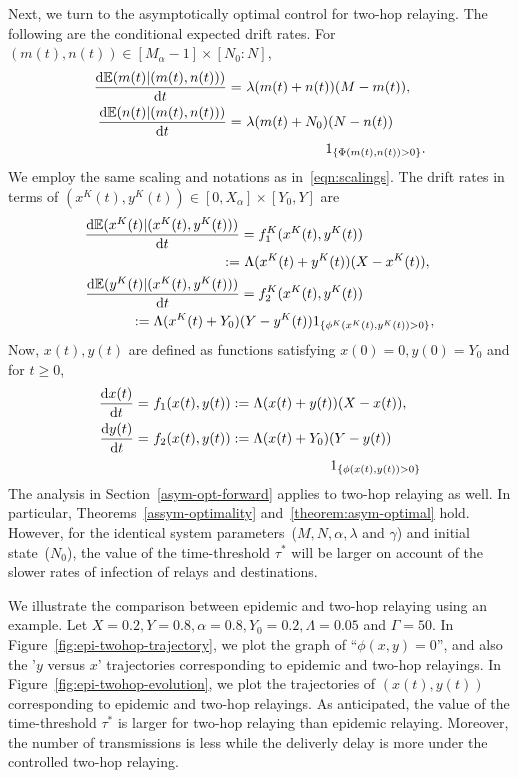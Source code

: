 \documentclass[10pt,journal,letterpaper]{IEEEtran}
\begin{document}
Next, we turn to the asymptotically optimal control for two-hop relaying.
The following are the conditional expected
drift rates. For $(m(t),n(t)) \in [M_{\alpha}-1] \times [N_0:N]$,
\begin{align*}
\frac{{\rm d}\mathbb{E}(m(t)|(m(t),n(t)))}{{\rm d}t} = &~\lambda (m(t) + n(t))(M-m(t)), \\
\frac{{\rm d}\mathbb{E}(n(t)|(m(t),n(t)))}{{\rm d}t} = &~\lambda (m(t) + N_0)(N-n(t)) \\
& \ \ \ \ \ \ \ \ \ \ \ \ \ \ \ \ \ \ 1_{\{\Phi(m(t),n(t)) > 0\}}.
\end{align*}
We employ the same scaling and notations as in~\eqref{eqn:scalings}. The drift rates
in terms of $(x^K(t),y^K(t)) \in [0, X_{\alpha}] \times [Y_0,Y]$ are
\begin{align*}
\frac{{\rm d}\mathbb{E}(x^K(t)|(x^K(t),y^K(t)))}{{\rm d}t} &= f^K_1(x^K(t),y^K(t))  \\
                                               := &~\Lambda (x^K(t) + y^K(t))(X-x^K(t)), \\
\frac{{\rm d}\mathbb{E}(y^K(t)|(x^K(t),y^K(t)))}{{\rm d}t} &= f^K_2(x^K(t),y^K(t)) \\
                                               := \Lambda (x^K(t) + Y_0)&(Y-y^K(t))1_{\{\phi^K(x^K(t),y^K(t)) > 0\}},
\end{align*}
Now, $x(t),y(t)$ are defined as functions satisfying $x(0)= 0, y(0) = Y_0$ and for
$t \geq 0$,
\begin{align*}
\frac{{\rm d}x(t)}{{\rm d}t} = &~f_1(x(t),y(t)) := \Lambda (x(t) + y(t))(X-x(t)), \\
\frac{{\rm d}y(t)}{{\rm d}t} = &~f_2(x(t),y(t)) := \Lambda (x(t) + Y_0)(Y-y(t)) \\
                            & \ \ \ \ \ \ \ \ \ \ \ \ \ \ \ \ \ \ \ \ \ \ \ \ \ \ \ \ \ \ \ \ \ \ \ \ \ \ \ 1_{\{\phi(x(t),y(t)) > 0\}}
\end{align*}
The analysis in Section~\ref{asym-opt-forward} applies to two-hop relaying
as well. In particular, Theorems~\ref{assym-optimality} and~\ref{theorem:asym-optimal} hold.
However, for the identical system parameters~($M,N,\alpha,\lambda$ and $\gamma$)
and initial state~($N_0$), the value of the time-threshold $\tau^{\ast}$ will be larger on account of the
slower rates of infection of relays and destinations.


We illustrate the comparison between epidemic and two-hop relaying using an example.
Let $X = 0.2,Y = 0.8,\alpha = 0.8,Y_0 = 0.2,\Lambda = 0.05$
and $\Gamma = 50$. In Figure~\ref{fig:epi-twohop-trajectory}, we plot the
graph of  ``$\phi(x,y) = 0$'', and also the '$y$ versus $x$' trajectories corresponding to
 epidemic and two-hop relayings. In Figure~\ref{fig:epi-twohop-evolution},
we plot the trajectories of $(x(t),y(t))$ corresponding to
 epidemic and two-hop relayings. As anticipated, the value of the time-threshold $\tau^{\ast}$ is larger
for two-hop relaying than epidemic relaying. Moreover, the number of transmissions is less while the deliverly delay is more 
under the controlled two-hop relaying. 
\end{document}
